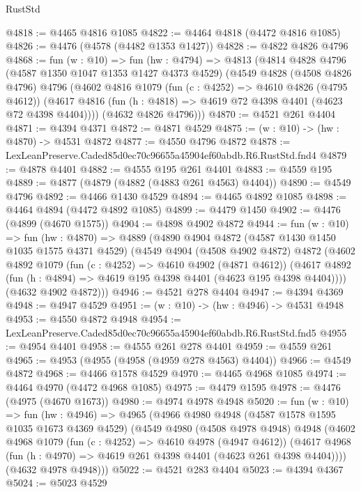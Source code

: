\begin{lexlean}{RustStd}
\begin{coremodule}
@4818 := @4465 @4816 @1085
@4822 := @4464 @4818 (@4472 @4816 @1085)
@4826 := @4476 (@4578 (@4482 @1353 @1427))
@4828 := @4822 @4826 @4796
@4868 := fun (w : @10) =>
  fun (hw : @4794) =>
  @4813
    (@4814
      @4828
      @4796
      (@4587 @1350 @1047 @1353 @1427 @4373 @4529)
      (@4549
        @4828
        (@4508 @4826 @4796)
        @4796
        (@4602
          @4816
          @1079
          (fun (c : @4252) => @4610 @4826 (@4795 @4612))
          (@4617 @4816 (fun (h : @4818) => @4619 @72 @4398 @4401 (@4623 @72 @4398 @4404))))
        (@4632 @4826 @4796)))
@4870 := @4521 @261 @4404
@4871 := @4394 @4371
@4872 := @4871 @4529
@4875 := (w : @10) -> (hw : @4870) -> @4531 @4872
@4877 := @4550 @4796 @4872
@4878 := LexLeanPreserve.Caded85d0ec70c96655a45904ef60abdb.R6.RustStd.fnd4
@4879 := @4878 @4401
@4882 := @4555 @195 @261 @4401
@4883 := @4559 @195
@4889 := @4877 (@4879 (@4882 (@4883 @261 @4563) @4404))
@4890 := @4549 @4796
@4892 := @4466 @1430 @4529
@4894 := @4465 @4892 @1085
@4898 := @4464 @4894 (@4472 @4892 @1085)
@4899 := @4479 @1450
@4902 := @4476 (@4899 (@4670 @1575))
@4904 := @4898 @4902 @4872
@4944 := fun (w : @10) =>
  fun (hw : @4870) =>
  @4889
    (@4890
      @4904
      @4872
      (@4587 @1430 @1450 @1035 @1575 @4371 @4529)
      (@4549
        @4904
        (@4508 @4902 @4872)
        @4872
        (@4602
          @4892
          @1079
          (fun (c : @4252) => @4610 @4902 (@4871 @4612))
          (@4617 @4892 (fun (h : @4894) => @4619 @195 @4398 @4401 (@4623 @195 @4398 @4404))))
        (@4632 @4902 @4872)))
@4946 := @4521 @278 @4404
@4947 := @4394 @4369
@4948 := @4947 @4529
@4951 := (w : @10) -> (hw : @4946) -> @4531 @4948
@4953 := @4550 @4872 @4948
@4954 := LexLeanPreserve.Caded85d0ec70c96655a45904ef60abdb.R6.RustStd.fnd5
@4955 := @4954 @4401
@4958 := @4555 @261 @278 @4401
@4959 := @4559 @261
@4965 := @4953 (@4955 (@4958 (@4959 @278 @4563) @4404))
@4966 := @4549 @4872
@4968 := @4466 @1578 @4529
@4970 := @4465 @4968 @1085
@4974 := @4464 @4970 (@4472 @4968 @1085)
@4975 := @4479 @1595
@4978 := @4476 (@4975 (@4670 @1673))
@4980 := @4974 @4978 @4948
@5020 := fun (w : @10) =>
  fun (hw : @4946) =>
  @4965
    (@4966
      @4980
      @4948
      (@4587 @1578 @1595 @1035 @1673 @4369 @4529)
      (@4549
        @4980
        (@4508 @4978 @4948)
        @4948
        (@4602
          @4968
          @1079
          (fun (c : @4252) => @4610 @4978 (@4947 @4612))
          (@4617 @4968 (fun (h : @4970) => @4619 @261 @4398 @4401 (@4623 @261 @4398 @4404))))
        (@4632 @4978 @4948)))
@5022 := @4521 @283 @4404
@5023 := @4394 @4367
@5024 := @5023 @4529

\end{coremodule}
\end{lexlean}
